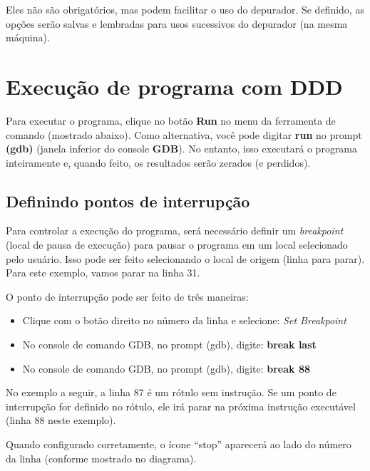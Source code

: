 Eles não são obrigatórios, mas podem facilitar o uso do depurador. Se definido, as opções serão salvas e lembradas para usos sucessivos do depurador (na mesma máquina).

\section{Execução de programa com DDD}
Para executar o programa, clique no botão \textbf{Run} no menu da ferramenta de comando (mostrado abaixo). Como alternativa, você pode digitar \textbf{run} no prompt \textbf{(gdb)} (janela inferior do console \textbf{GDB}). No entanto, isso executará o programa inteiramente e, quando feito, os resultados serão zerados (e perdidos).

\subsection{Definindo pontos de interrupção}
Para controlar a execução do programa, será necessário definir um \textit{breakpoint} (local de pausa de execução) para pausar o programa em um local selecionado pelo usuário. Isso pode ser feito selecionando o local de origem (linha para parar). Para este exemplo, vamos parar na linha 31.

O ponto de interrupção pode ser feito de três maneiras:\begin{itemize}
	\item Clique com o botão direito no número da linha e selecione: \textit{Set Breakpoint}
	\item No console de comando GDB, no prompt (gdb), digite: \textbf{break last}
	\item No console de comando GDB, no prompt (gdb), digite: \textbf{break 88}
\end{itemize}

No exemplo a seguir, a linha 87 é um rótulo sem instrução. Se um ponto de interrupção for definido no rótulo, ele irá parar na próxima instrução executável (linha 88 neste exemplo).

Quando configurado corretamente, o ícone ``stop'' aparecerá ao lado do número da linha (conforme mostrado no diagrama).

